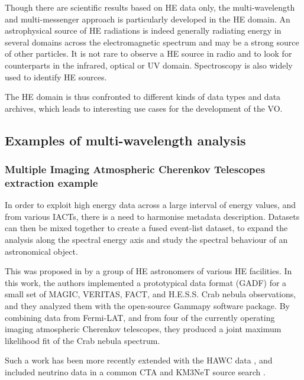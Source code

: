 \documentclass[11pt,a4paper]{ivoa}
\begin{document}
Though there are scientific results based on HE data only, the multi-wavelength and multi-messenger approach is particularly developed in the HE domain. An astrophysical source of HE radiations is indeed generally radiating energy in several domains across the electromagnetic spectrum and may be a strong source of other particles. It is not rare to observe a HE source in radio and to look for counterparts in the infrared, optical or UV domain. Spectroscopy is also widely used to identify HE sources.

The HE domain is thus confronted to different kinds of data types and data archives, which leads to interesting use cases for the development of the VO.



\subsection{Examples of multi-wavelength analysis}

\subsubsection{Multiple Imaging Atmospheric Cherenkov Telescopes extraction example}

In order to exploit high energy data across a large interval of energy values, and from various IACTs, there is a need to harmonise metadata description.
Datasets can then be mixed together to create a fused event-list dataset, to expand the analysis along the spectral energy axis and study the spectral behaviour of an astronomical object.

This was proposed in \citep{2019A&A...625A..10N} by a group of HE astronomers of various HE facilities.
In this work, the authors implemented a prototypical data format (GADF) for a small set of MAGIC, VERITAS, FACT, and H.E.S.S. Crab nebula observations, and they analyzed them with the open-source Gammapy software package. By combining data from Fermi-LAT, and from four of the currently operating imaging atmospheric Cherenkov telescopes, they produced a joint maximum likelihood fit of the Crab nebula spectrum.

Such a work has been more recently extended with the HAWC data \citep{2022A&A...667A..36A}, and included neutrino data in a common CTA and KM3NeT source search \citep{unbehaun2023prospects}.
\end{document}
